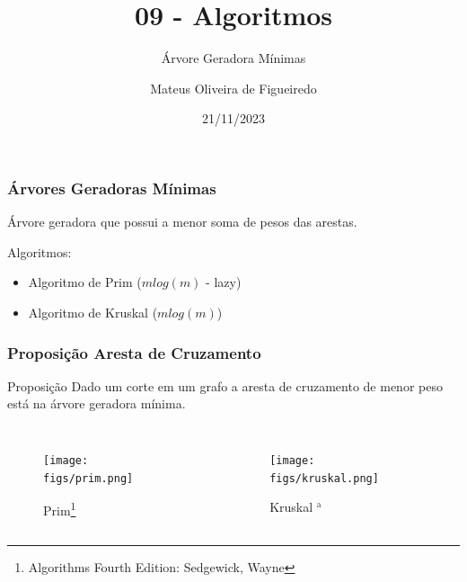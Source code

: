 \documentclass[aspectratio=169,usenames,dvipsnames]{beamer}
\title{09 - Algoritmos}
\subtitle{Árvore Geradora Mínimas}
\author{Mateus Oliveira de Figueiredo}
\date{21/11/2023}
\begin{document}
\begin{frame}
\titlepage
\end{frame}

\begin{frame}
\frametitle{Árvores Geradoras Mínimas}

Árvore geradora que possui a menor soma de pesos das arestas.

\vfill
Algoritmos:
\begin{itemize}
  \item Algoritmo de Prim ($mlog(m)$ - lazy)
  \item Algoritmo de Kruskal ($mlog(m)$)
\end{itemize}
\vfill
\end{frame}


\begin{frame}
\frametitle{Proposição Aresta de Cruzamento}

\vfill
\begin{block}{Proposição}
    Dado um corte em um grafo a aresta de cruzamento de menor peso está na árvore geradora mínima.
\end{block}
\vfill

\begin{columns}

\begin{figure}[ht]
\centering
\texttt{[image: figs/prim.png]}
\caption{Prim\footnote{Algorithms Fourth Edition: Sedgewick, Wayne}}
\end{figure}

\begin{figure}[ht]
\centering
\texttt{[image: figs/kruskal.png]}
\caption{Kruskal $^\text{a}$}
\end{figure}
\end{columns}
\vfill



\end{frame}
\end{document}
